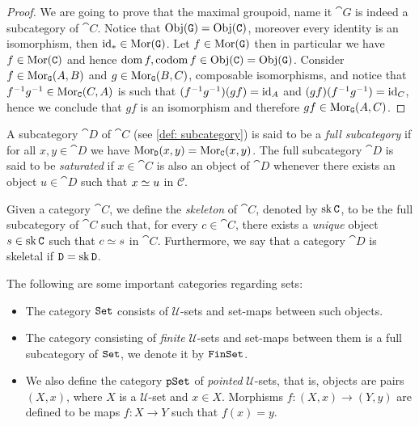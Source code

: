 \begin{proof}
    We are going to prove that the maximal groupoid, name it \(\cat G\) is indeed
    a subcategory of \(\cat C\). Notice that \(\operatorname{Obj}(\texttt G) = \operatorname{Obj}(\texttt C)\),
    moreover every identity is an isomorphism, then \(\operatorname{id}_{*} \in \operatorname{Mor}(\texttt G)\).
    Let \(f \in \operatorname{Mor}(\texttt G)\) then in particular we have \(f \in \operatorname{Mor}(\texttt C)\)
    and hence \(\operatorname{dom} f, \operatorname{codom} f \in \operatorname{Obj}(\texttt C) =
    \operatorname{Obj}(\texttt G)\). Consider \(f \in \operatorname{Mor}_{\texttt G}(A, B)\) and \(g \in \operatorname{Mor}_{\texttt
        G}(B, C)\), composable isomorphisms, and notice that \(f^{-1}  g^{-1}
    \in \operatorname{Mor}_{\texttt C}(C, A)\) is such that \((f^{-1}  g^{-1})  (g
    f) = \operatorname{id}_A\) and \((g  f)  (f^{-1}  g^{-1}) = \operatorname{id}_C\), hence we
    conclude that \(g  f\) is an isomorphism and therefore \(g  f \in
    \operatorname{Mor}_{\texttt G}(A, C)\).
\end{proof}

\begin{definition}\label{def: full subcategory}
    A subcategory \(\cat D\) of \(\cat C\) (see \cref{def: subcategory}) is said to
    be a \emph{full subcategory} if for all \(x, y \in \cat D\) we have
    \(\operatorname{Mor}_{\texttt D}(x, y) = \operatorname{Mor}_{\texttt C}(x, y)\). The full subcategory \(\cat D\)
    is said to be \emph{saturated} if \(x \in \cat C\) is also an object of \(\cat D\)
    whenever there exists an object \(u \in \cat D\) such that \(x \simeq u\) in
    \(\mathcal C\).
\end{definition}

\begin{definition}[Skeleton]
    \label{def:skeleton-category}
    Given a category \(\cat C\), we define the \emph{skeleton} of \(\cat C\),
    denoted by \(\operatorname{sk} \texttt C\), to be the full subcategory of \(\cat C\) such that,
    for every \(c \in \cat C\), there exists a \emph{unique} object
    \(s \in \operatorname{sk} \texttt C\) such that \(c \simeq s\) in \(\cat C\). Furthermore, we say
    that a category \(\cat D\) is skeletal if \(\texttt D = \operatorname{sk} \texttt D\).
\end{definition}

\begin{example}
    \label{exp:set-based-categories}
    The following are some important categories regarding sets:
    \begin{itemize}\setlength\itemsep{0em}
        \item The category \({\texttt{Set}}\) consists of \(\mathcal U\)-sets and set-maps between
              such objects.
        \item The category consisting of \emph{finite} \(\mathcal U\)-sets and set-maps
              between them is a full subcategory of \({\texttt{Set}}\), we denote it by \({\texttt{FinSet}}\).
        \item We also define the category \({\texttt{pSet}}\) of \emph{pointed} \(\mathcal
              U\)-sets, that is, objects are pairs \((X, x)\), where \(X\) is a \(\mathcal
              U\)-set and \(x \in X\). Morphisms \(f: (X, x) \to (Y, y)\) are defined to be
              maps \(f: X \to Y\) such that \(f(x) = y\).
    \end{itemize}
\end{example}

